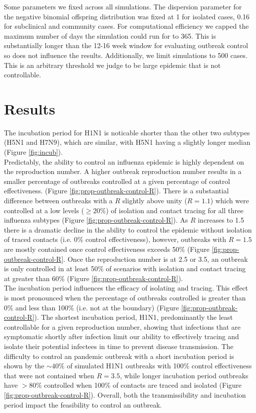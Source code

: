 \documentclass{article}
\begin{document}
Some parameters we fixed across all simulations. The dispersion parameter for the negative binomial offspring distribution was fixed at 1 for isolated cases, 0.16 for subclinical and community cases. For computational efficiency we capped the maximum number of days the simulation could run for to 365. This is substantially longer than the 12-16 week window for evaluating outbreak control so does not influence the results. Additionally, we limit simulations to 500 cases. This is an arbitrary threshold we judge to be large epidemic that is not controllable. \\

\section*{Results}

The incubation period for H1N1 is noticable shorter than the other two subtypes (H5N1 and H7N9), which are similar, with H5N1 having a slightly longer median (Figure \ref{fig:incub}). \\

Predictably, the ability to control an influenza epidemic is highly dependent on the reproduction number. A higher outbreak reproduction number results in a smaller percentage of outbreaks controlled at a given percentage of control effectiveness. (Figure \ref{fig:prop-outbreak-control-R}). There is a substantial difference between outbreaks with a $R$ slightly above unity ($R = 1.1$) which were controlled at a low levels ($\geq 20\%$) of isolation and contact tracing for all three influenza subtypes (Figure \ref{fig:prop-outbreak-control-R}). As $R$ increases to 1.5 there is a dramatic decline in the ability to control the epidemic without isolation of traced contacts (i.e. 0\% control effectiveness), however, outbreaks with $R = 1.5$ are mostly contained once control effectiveness exceeds 50\% (Figure \ref{fig:prop-outbreak-control-R}. Once the reproduction number is at 2.5 or 3.5, an outbreak is only controlled in at least 50\% of scenarios with isolation and contact tracing at greater than 60\% (Figure \ref{fig:prop-outbreak-control-R}). \\

The incubation period influences the efficacy of isolating and tracing. This effect is most pronounced when the percentage of outbreaks controlled is greater than 0\% and less than 100\% (i.e. not at the boundary) (Figure \ref{fig:prop-outbreak-control-R}). The shortest incubation period, H1N1, predominantly the least controllable for a given reproduction number, showing that infections that are symptomatic shortly after infection limit our ability to effectively tracing and isolate their potential infectees in time to prevent disease transmission. The difficulty to control an pandemic outbreak with a short incubation period is shown by the $\sim 40\%$ of simulated H1N1 outbreaks with 100\% control effectiveness that were not contained when $R = 3.5$, while longer incubation period outbreaks have $>80\%$ controlled when 100\% of contacts are traced and isolated (Figure \ref{fig:prop-outbreak-control-R}). Overall, both the transmissibility and incubation period impact the feasibility to control an outbreak. \\
\end{document}
